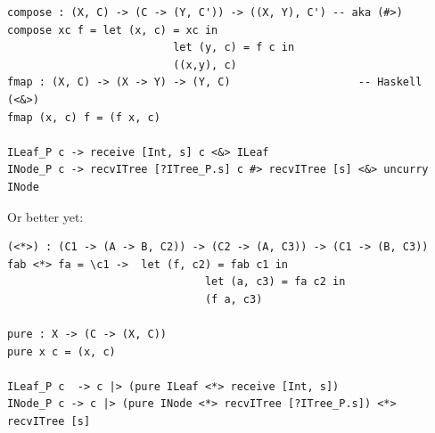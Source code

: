 
\begin{lstlisting}
compose : (X, C) -> (C -> (Y, C')) -> ((X, Y), C') -- aka (#>)
compose xc f = let (x, c) = xc in
                          let (y, c) = f c in
                          ((x,y), c)
fmap : (X, C) -> (X -> Y) -> (Y, C)                    -- Haskell (<&>)
fmap (x, c) f = (f x, c)

ILeaf_P c -> receive [Int, s] c <&> ILeaf
INode_P c -> recvITree [?ITree_P.s] c #> recvITree [s] <&> uncurry INode
\end{lstlisting}

Or better yet:
\begin{lstlisting}
(<*>) : (C1 -> (A -> B, C2)) -> (C2 -> (A, C3)) -> (C1 -> (B, C3))
fab <*> fa = \c1 ->  let (f, c2) = fab c1 in
                               let (a, c3) = fa c2 in
                               (f a, c3)

pure : X -> (C -> (X, C))
pure x c = (x, c)

ILeaf_P c  -> c |> (pure ILeaf <*> receive [Int, s])
INode_P c -> c |> (pure INode <*> recvITree [?ITree_P.s]) <*> recvITree [s]

\end{lstlisting}

